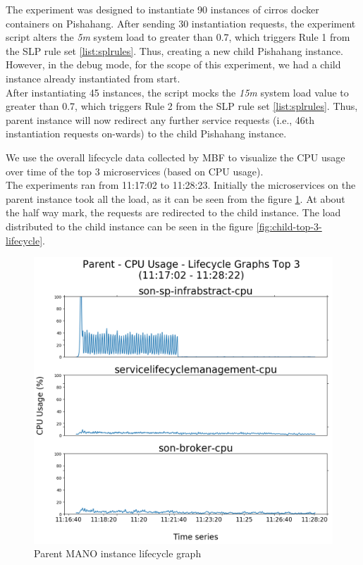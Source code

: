 The experiment was designed to instantiate 90 instances of  cirros docker containers on Pishahang. 
After sending 30 instantiation requests, the experiment script alters the \textit{5m} system load to greater than 0.7, which triggers Rule 1 from the SLP rule set \ref{list:splrules}. 
Thus, creating a new child Pishahang instance. 
However, in the debug mode, for the scope of this experiment, we had a child instance already instantiated from start.\\

After instantiating 45 instances, the script mocks the \textit{15m} system load value to greater than 0.7, which triggers Rule 2 from the SLP rule set \ref{list:splrules}. 
Thus, parent instance will now redirect any further service requests (i.e., 46th instantiation requests on-wards) to the child Pishahang instance.

We use the overall lifecycle data collected by MBF to visualize the CPU usage over time of the top 3 microservices (based on CPU usage).\\

The experiments ran from 11:17:02 to 11:28:23. 
Initially the microservices on the parent instance took all the load, as it can be seen from the figure \ref{fig:parent-top-3-lifecycle}. 
At about the half way mark, the requests are redirected to the child instance. 
The load distributed to the child instance can be seen in the figure \ref{fig:child-top-3-lifecycle}. 


\begin{figure}
	\centering
	\includegraphics[width=0.65\linewidth]{figures/scalability_graphs/Scalability-Evaluation/Parent-TOP-3-Lifecycle}
	\caption{Parent MANO instance lifecycle graph}
	\label{fig:parent-top-3-lifecycle}
\end{figure}


